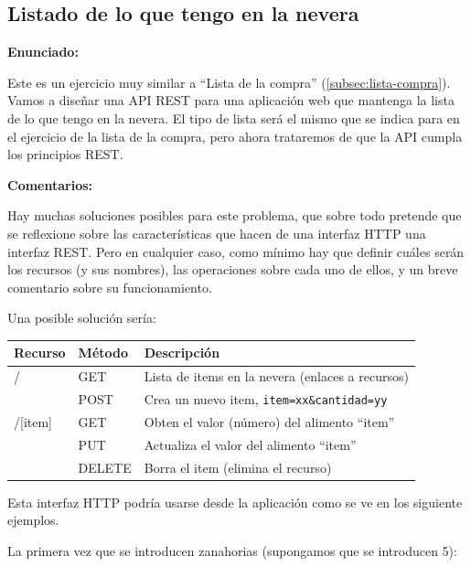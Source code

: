 \subsection{Listado de lo que tengo en la nevera}
\label{subsec:contenido-nevera}

\textbf{Enunciado:}

Este es un ejercicio muy similar a ``Lista de la compra'' (\ref{subsec:lista-compra}). Vamos a diseñar una API REST para una aplicación web que mantenga la lista de lo que tengo en la nevera. El tipo de lista será el mismo que se indica para en el ejercicio de la lista de la compra, pero ahora trataremos de que la API cumpla los principios REST.

\textbf{Comentarios:}

Hay muchas soluciones posibles para este problema, que sobre todo pretende que se reflexione sobre las características que hacen de una interfaz HTTP una interfaz REST. Pero en cualquier caso, como mínimo hay que definir cuáles serán los recursos (y sus nombres), las operaciones sobre cada uno de ellos, y un breve comentario sobre su funcionamiento.

Una posible solución sería: \\

\begin{tabular}{l|l|p{10cm}}
  Recurso & Método & Descripción \\ \hline \hline
  /       & GET    & Lista de items en la nevera (enlaces a recursos) \\
          & POST   & Crea un nuevo item, \verb|item=xx&cantidad=yy| \\
  /[item] & GET    & Obten el valor (número) del alimento ``item'' \\
          & PUT    & Actualiza el valor del alimento ``item'' \\
          & DELETE & Borra el item (elimina el recurso) \\
\end{tabular}

Esta interfaz HTTP podría usarse desde la aplicación como se ve en los siguiente ejemplos.

La primera vez que se introducen zanahorias (supongamos que se introducen 5):

